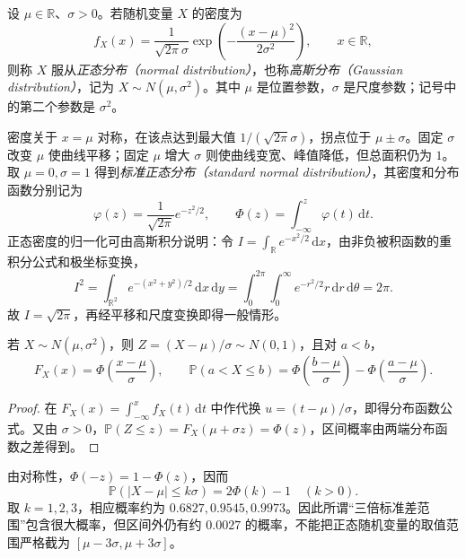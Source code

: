 \begin{definition}
\label{def:study-normal}
设 $\mu\in\mathbb R$、$\sigma>0$。若随机变量 $X$ 的密度为
\begin{equation}
  f_X(x)=\frac1{\sqrt{2\pi}\sigma}
    \exp\left(-\frac{(x-\mu)^2}{2\sigma^2}\right),
  \qquad x\in\mathbb R,
  \label{eq:study-normal-density}
\end{equation}
则称 $X$ 服从\emph{正态分布（normal distribution）}，也称\emph{高斯分布（Gaussian distribution）}，记为 $X\sim N(\mu,\sigma^2)$。其中 $\mu$ 是位置参数，$\sigma$ 是尺度参数；记号中的第二个参数是 $\sigma^2$。
\end{definition}

密度关于 $x=\mu$ 对称，在该点达到最大值 $1/(\sqrt{2\pi}\sigma)$，拐点位于 $\mu\pm\sigma$。固定 $\sigma$ 改变 $\mu$ 使曲线平移；固定 $\mu$ 增大 $\sigma$ 则使曲线变宽、峰值降低，但总面积仍为 $1$。取 $\mu=0,\sigma=1$ 得到\emph{标准正态分布（standard normal distribution）}，其密度和分布函数分别记为
\begin{equation}
  \varphi(z)=\frac1{\sqrt{2\pi}}e^{-z^2/2},\qquad
  \Phi(z)=\int_{-\infty}^z\varphi(t)\,\mathrm dt.
  \label{eq:study-standard-normal}
\end{equation}
正态密度的归一化可由高斯积分说明：令 $I=\int_{\mathbb R}e^{-x^2/2}\,\mathrm dx$，由非负被积函数的重积分公式和极坐标变换，
\[
  I^2=\int_{\mathbb R^2}e^{-(x^2+y^2)/2}\,\mathrm dx\,\mathrm dy
  =\int_0^{2\pi}\!\int_0^{\infty}e^{-r^2/2}r\,\mathrm dr\,\mathrm d\theta
  =2\pi.
\]
故 $I=\sqrt{2\pi}$，再经平移和尺度变换即得一般情形。

\begin{proposition}[标准化公式]
\label{prop:study-normal-standardization}
若 $X\sim N(\mu,\sigma^2)$，则 $Z=(X-\mu)/\sigma\sim N(0,1)$，且对 $a<b$，
\begin{equation}
  F_X(x)=\Phi\left(\frac{x-\mu}{\sigma}\right),\qquad
  \mathbb P(a<X\le b)=
    \Phi\left(\frac{b-\mu}{\sigma}\right)
    -\Phi\left(\frac{a-\mu}{\sigma}\right).
  \label{eq:study-normal-standardization}
\end{equation}
\end{proposition}

\begin{proof}
在 $F_X(x)=\int_{-\infty}^xf_X(t)\,\mathrm dt$ 中作代换 $u=(t-\mu)/\sigma$，即得分布函数公式。又由 $\sigma>0$，$\mathbb P(Z\le z)=F_X(\mu+\sigma z)=\Phi(z)$，区间概率由两端分布函数之差得到。
\end{proof}

由对称性，$\Phi(-z)=1-\Phi(z)$，因而
\begin{equation}
  \mathbb P(|X-\mu|\le k\sigma)=2\Phi(k)-1\quad(k>0).
  \label{eq:study-normal-central-probability}
\end{equation}
取 $k=1,2,3$，相应概率约为 $0.6827,0.9545,0.9973$。因此所谓“三倍标准差范围”包含很大概率，但区间外仍有约 $0.0027$ 的概率，不能把正态随机变量的取值范围严格截为 $[\mu-3\sigma,\mu+3\sigma]$。

